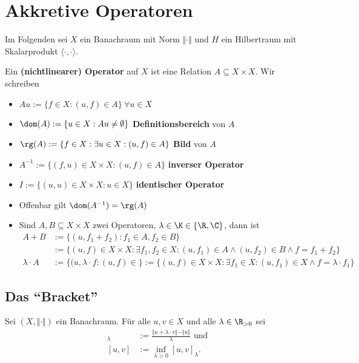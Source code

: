 
\chapter{Akkretive Operatoren}
Im Folgenden sei $X$ ein Banachraum mit Norm $\Vert\cdot\Vert$ und $H$ ein Hilbertraum mit Skalarprodukt $\langle\cdot,\cdot\rangle$.

\begin{definition}
Ein \textbf{(nichtlinearer) Operator} auf $X$ ist eine Relation $A\subseteq X\times X$. Wir schreiben
\begin{itemize}
\item $Au:=\lbrace f\in X:(u,f)\in A\rbrace~\forall u\in X$
\item $\dom(A):=\lbrace u\in X:Au\neq\emptyset\rbrace$ \textbf{Definitionsbereich} von $A$
\item $\rg(A):=\lbrace f\in X:\exists u\in X:(u,f)\in A\rbrace$ \textbf{Bild} von $A$
\item $A^{-1}:=\lbrace (f,u)\in X\times X:(u,f)\in A\rbrace$ \textbf{inverser Operator}
\item $I:=\lbrace(u,u)\in X\times X:u\in X\rbrace$ \textbf{identischer Operator}
\item Offenbar gilt $\dom(A^{-1})=\rg(A)$
\item Sind $A,B\subseteq X\times X$ zwei Operatoren, $\lambda\in\K\in\lbrace\R,\C\rbrace$, dann ist
\begin{align*}
A+B&:=\lbrace(u,f_1+f_2):f_1\in A,f_2\in B\rbrace\\
&:=\lbrace(u,f)\in X\times X:\exists f_1,f_2\in X:(u,f_1)\in A\wedge(u,f_2)\in B\wedge f=f_1+f_2\rbrace\\
\lambda\cdot A&:=\lbrace(u,\lambda\cdot f:(u,f)\in \rbrace:=\lbrace(u,f)\in X\times X:\exists f_1\in X:(u,f_1)\in X\wedge f=\lambda\cdot f_1\rbrace
\end{align*}
\end{itemize}
\end{definition}

\section{Das ``Bracket''}
Sei $(X,\Vert\cdot\Vert)$ ein Banachraum. Für alle $u,v\in X$ und alle $\lambda\in\R_{>0}$ sei
\begin{align*}
[u,v]_\lambda&:=\frac{\Vert u+\lambda\cdot v\Vert-\Vert u\Vert}{\lambda}\text{ und}\\
[u,v]&:=\inf\limits_{\lambda>0}[u,v]_\lambda.
\end{align*}


